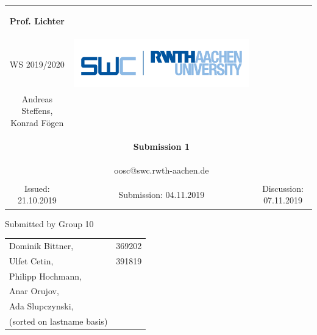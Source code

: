 \documentclass[a4paper,12pt,oneside]{scrreprt}
\begin{document}
	
\begin{tabular}{ccc}
	\begin{large} \textbf{Prof. Lichter} \end{large} &
	
	\begin{minipage}[H]{3.5cm}
	\centering
		\begin{large} OOSC \end{large} \\
		\begin{large} WS 2019/2020 \end{large}
	\end{minipage} &
	
	\begin{minipage}[H]{4cm}
		\includegraphics[keepaspectratio,width=\textwidth,angle=0]{images/swc.png}
	\end{minipage} \\
Andreas Steffens, Konrad F\"ogen &  &  \\
& \begin{huge} \textbf{Submission 1} \end{huge}&  \\
& oosc@swc.rwth-aachen.de &  \\
& & \\
Issued: 21.10.2019 &
Submission: 04.11.2019 &
Discussion: 07.11.2019 \\
\end{tabular}
\newline \newline \newline
\centering
Submitted by Group 10

\begin{tabular}{ll}
	Dominik Bittner, & 369202 \\
	Ulfet Cetin, & 391819\\
 	Philipp Hochmann,\\
 	Anar Orujov,\\
 	Ada Slupczynski, \\
 	(sorted on lastname basis)
\end{tabular}
\end{document}
